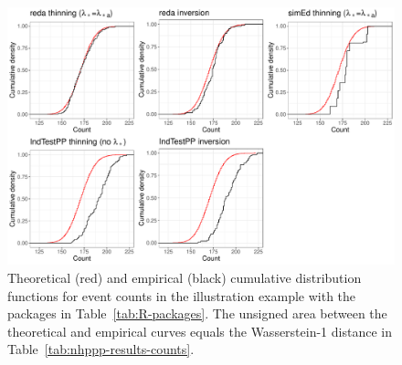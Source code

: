 \documentclass[article]{jss}\usepackage[]{graphicx}\usepackage[]{xcolor}
\makeatletter
\def\maxwidth{ %
  \ifdim\Gin@nat@width>\linewidth
    \linewidth
  \else
    \Gin@nat@width
  \fi
}
\makeatother
\begin{document}
\begin{Schunk}
\begin{figure}
\includegraphics[width=\maxwidth]{figure/r-pkgs-pkg-counts-1} \caption{Theoretical (red) and empirical (black) cumulative distribution functions for event counts in the illustration example with the  packages in Table~\ref{tab:R-packages}. The unsigned area between the theoretical and empirical curves equals the Wasserstein-1 distance in Table~\ref{tab:nhppp-results-counts}.}\label{fig:r-pkgs-pkg-counts}
\end{figure}
\end{Schunk}
\end{document}
